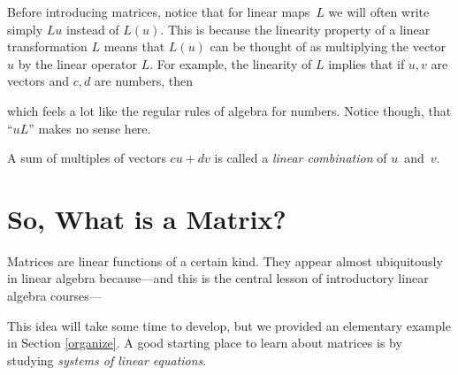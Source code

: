Before introducing matrices, notice that for linear maps~$L$ we will often write simply $L u$ instead of $L(u)$. This is because the linearity
property of a linear transformation $L$ means that $L(u)$ can be thought of as multiplying the vector $u$ by the linear operator $L$.
For example, the linearity of $L$ implies that if $u,v$ are vectors and $c,d$ are numbers, then
\begin{center}
\end{center}
which feels a lot like the regular rules of algebra for numbers. Notice though, that ``$u L$'' makes no sense here.

\begin{remark}
A sum of multiples of vectors $c u + dv$ is called a {\itshape linear combination} of $u$~and~$v$.
\end{remark}

\section{So, What is a Matrix?}
Matrices are linear functions of a certain kind. 
They appear almost ubiquitously in linear algebra because---and this is the central lesson of introductory linear algebra courses---
\begin{center}
\end{center}
This idea will take some time to develop, but we provided an elementary example in 
Section \ref{organize}. A good starting place to  learn about matrices is by studying {\itshape systems of  linear equations}. 


